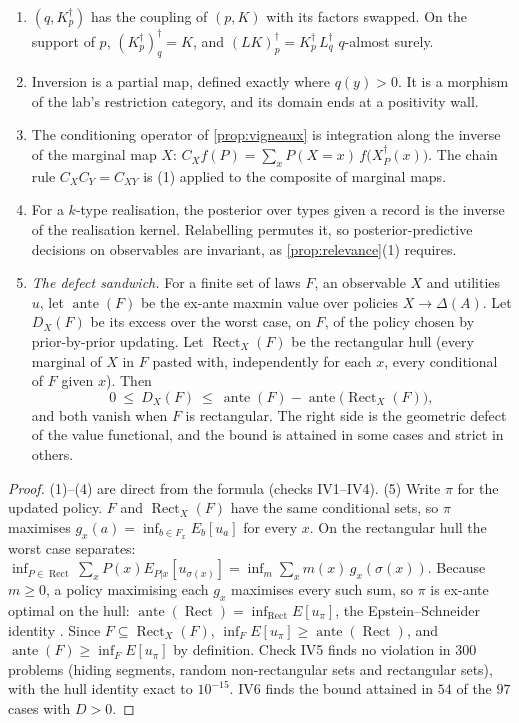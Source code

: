 \begin{proposition}[inversion]\label{prop:inversion}
\begin{enumerate}
\item[(1)] $(q,K^\dagger_p)$ has the coupling of $(p,K)$ with its factors swapped. On the support of $p$, $(K^\dagger_p)^\dagger_q=K$, and
  $(LK)^\dagger_p=K^\dagger_p\,L^\dagger_q$ $q$-almost surely.
\item[(2)] Inversion is a partial map, defined exactly where $q(y)>0$. It is a morphism of the lab's restriction category, and its domain
  ends at a positivity wall.
\item[(3)] The conditioning operator of \cref{prop:vigneaux} is integration along the inverse of the marginal map $X$:
  $C_Xf(P)=\sum_xP(X{=}x)\,f\bigl(X^\dagger_P(x)\bigr)$. The chain rule $C_XC_Y=C_{XY}$ is (1) applied to the composite of marginal maps.
\item[(4)] For a $k$-type realisation, the posterior over types given a record is the inverse of the realisation kernel. Relabelling
  permutes it, so posterior-predictive decisions on observables are invariant, as \cref{prop:relevance}(1) requires.
\item[(5)] \emph{The defect sandwich.} For a finite set of laws $F$, an observable $X$ and utilities $u$, let $\operatorname{ante}(F)$ be
  the ex-ante maxmin value over policies $X\to\Delta(A)$. Let $D_X(F)$ be its excess over the worst case, on $F$, of the policy chosen
  by prior-by-prior updating. Let $\operatorname{Rect}_X(F)$ be the rectangular hull (every marginal of $X$ in $F$ pasted with, independently
  for each $x$, every conditional of $F$ given $x$). Then
  \[
  0\ \le\ D_X(F)\ \le\ \operatorname{ante}(F)-\operatorname{ante}\bigl(\operatorname{Rect}_X(F)\bigr),
  \]
  and both vanish when $F$ is rectangular. The right side is the geometric defect of the value functional, and the bound is attained in some
  cases and strict in others.
\end{enumerate}
\end{proposition}

\begin{proof}
(1)--(4) are direct from the formula (checks IV1--IV4). (5) Write $\pi$ for the updated policy. $F$ and $\operatorname{Rect}_X(F)$ have
the same conditional sets, so $\pi$ maximises $g_x(a)=\inf_{b\in F_x}E_b[u_a]$ for every $x$. On the rectangular hull the worst case
separates: $\inf_{P\in\operatorname{Rect}}\sum_xP(x)E_{P|x}[u_{\sigma(x)}]=\inf_m\sum_xm(x)\,g_x(\sigma(x))$. Because $m\ge0$, a policy maximising each
$g_x$ maximises every such sum, so $\pi$ is ex-ante optimal on the hull: $\operatorname{ante}(\operatorname{Rect})=\inf_{\operatorname{Rect}}E[u_\pi]$, the Epstein--Schneider
identity \cite{EpsteinSchneider2003}. Since $F\subseteq\operatorname{Rect}_X(F)$, $\inf_FE[u_\pi]\ge\operatorname{ante}(\operatorname{Rect})$, and
$\operatorname{ante}(F)\ge\inf_FE[u_\pi]$ by definition. Check IV5 finds no violation in $300$ problems (hiding segments, random non-rectangular sets
and rectangular sets), with the hull identity exact to $10^{-15}$. IV6 finds the bound attained in $54$ of the $97$ cases with $D>0$.
\end{proof}

